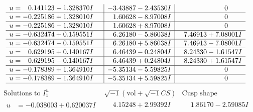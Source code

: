 \documentclass[1p]{elsarticle_modified}
\theoremstyle{definition}
\newcommand{\I}{\sqrt{-1}}
\begin{document}
$$\begin{array}{c|c|c}
\begin{aligned}
u &= \phantom{-}0.141123 - 1.328370 I\end{aligned}
 & -3.43887 - 2.43530 I & \phantom{-0.000000 } 0 \\ \hline\begin{aligned}
u &= -0.225186 + 1.328010 I\end{aligned}
 & \phantom{-}1.60628 - 8.97008 I & \phantom{-0.000000 } 0 \\ \hline\begin{aligned}
u &= -0.225186 - 1.328010 I\end{aligned}
 & \phantom{-}1.60628 + 8.97008 I & \phantom{-0.000000 } 0 \\ \hline\begin{aligned}
u &= -0.632474 + 0.159551 I\end{aligned}
 & \phantom{-}6.26180 - 5.86038 I & \phantom{-}7.46913 + 7.08001 I \\ \hline\begin{aligned}
u &= -0.632474 - 0.159551 I\end{aligned}
 & \phantom{-}6.26180 + 5.86038 I & \phantom{-}7.46913 - 7.08001 I \\ \hline\begin{aligned}
u &= \phantom{-}0.629195 + 0.140167 I\end{aligned}
 & \phantom{-}6.46439 - 0.24804 I & \phantom{-}8.24330 - 1.61547 I \\ \hline\begin{aligned}
u &= \phantom{-}0.629195 - 0.140167 I\end{aligned}
 & \phantom{-}6.46439 + 0.24804 I & \phantom{-}8.24330 + 1.61547 I \\ \hline\begin{aligned}
u &= -0.178389 + 1.364910 I\end{aligned}
 & -5.35134 - 5.59825 I & \phantom{-0.000000 } 0 \\ \hline\begin{aligned}
u &= -0.178389 - 1.364910 I\end{aligned}
 & -5.35134 + 5.59825 I & \phantom{-0.000000 } 0\\
 \hline 
 \end{array}$$\newpage$$\begin{array}{c|c|c}  
\text{Solutions to }I^u_{1}& \I (\text{vol} + \sqrt{-1}CS) & \text{Cusp shape}\\
 \hline 
\begin{aligned}
u &= -0.038003 + 0.620037 I\end{aligned}
 & \phantom{-}4.15248 + 2.99392 I & \phantom{-}1.86170 - 2.59085 I \\ \hline\begin{aligned}

\end{aligned}
\end{array}$$
\end{document}

